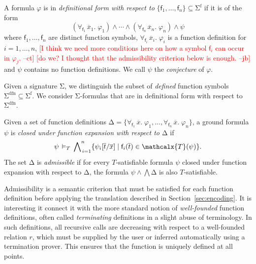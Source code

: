 \documentclass[runningheads,a4paper]{llncs}
\renewcommand\models{\mathrel{\vDash}}
\newcommand\DDD{\Delta}
\newcommand{\con}[1]{\mathsf{#1}}
\renewcommand\vec[1]{\overline{#1}}
\let\oldSigma=\Sigma
\def\Sigma{\mathrm{\oldSigma}}
\let\oldDelta=\Delta
\def\Delta{\mathrm{\oldDelta}}
\let\oldwedge=\wedge
\def\wedge{\mathrel{\oldwedge}}
\newcommand{\terms}{\mathcalx{T}}
\newcommand{\sfuns}[1]{#1^\mathrm{f}}
\newcommand{\sfundefs}[1]{#1^\mathrm{dfn}}
\newcommand{\forallf}[1]{\forall_{\!#1\:}}
\newcommand{\rem}[1]{\textcolor{red}{[#1]}}
\newcommand{\jb}[1]{\rem{#1 --jb}}
\newcommand{\ct}[1]{\rem{#1 --ct}}
\begin{document}
\begin{definition}\rm
A formula $\varphi$ is in \emph{definitional form with respect to}
$\{ \con{f}_1, \ldots, \con{f}_n \} \subseteq \sfuns{\Sigma}$ if it is of the
form
%
%
\[(\forallf{\con{f}_1} \vec x_1.\; \varphi_1) \wedge \cdots \wedge
(\forallf{\con{f}_n} \vec x_n.\; \varphi_n) \wedge \psi\]
%
where $\con{f}_1, \ldots, \con{f}_n$ are distinct function symbols,
$\forallf{\con{f}_i} \vec x_i.\; \varphi_i$ is a function definition
for $i = 1, \ldots, n$,
%
\ct{I think we need more conditions here on how a symbol $\con{f}_i$ can occur in $\varphi_j$.}
\jb{do we? I thought that the admissibility criterion below is enough.}
and $\psi$ contains no function definitions.
We call $\psi$ the \emph{conjecture} of $\varphi$.
\end{definition}

Given a signature $\Sigma$, we distinguish the subset of \emph{defined}
function symbols $\sfundefs{\Sigma} \subseteq \sfuns{\Sigma}$.
We consider $\Sigma$-formulas that are in definitional form with respect to
$\sfundefs{\Sigma}$.

\begin{definition}\rm
Given a set of function definitions 
$\DDD = \{ \forallf{\con{f}_1} \vec x.\; \varphi_1, \ldots, \forallf{\con{f}_n} \vec x.\; \varphi_n \}$, 
a ground formula $\psi$ 
is \emph{closed under function expansion with respect to $\DDD$} if 
\[
 \psi \,\models_T\, \bigwedge\nolimits_{\,i=1}^{n} \{ \psi_i[ \vec t / \vec x ] \mid \con{f}_i( \vec t ) \in \terms( \psi ) \} .
\]
The set $\DDD$ is \emph{admissible} if for every $T$-satisfiable formula 
$\psi$ closed under function expansion with respect to $\DDD$,
the formula
$\psi \wedge \bigwedge \Delta$ is also $T$-satisfiable.
\end{definition}

Admissibility is a semantic criterion that must be satisfied for each function
definition before applying the translation described in
Section~\ref{sec:encoding}. It is interesting it connect it with the more
standard notion of \emph{well-founded} function definitions, often called
\emph{terminating} definitions in a slight abuse of terminology. In such
definitions, all recursive calls are decreasing with respect to a well-founded
relation $r$, which must be supplied by the user or inferred automatically
using a termination prover. This ensures that the function is uniquely defined
at all points.
\end{document}
